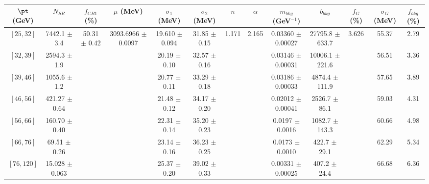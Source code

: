 \begin{tabular}{c||c|c|c|c|c|c|c|c|c|c|c||c}
$\pt$ (GeV) & $N_{SR}$ & $f_{CB1}$ (\%) & $\mu$ (MeV) & $\sigma_1$ (MeV) & $\sigma_2$ (MeV) & $n$ & $\alpha$ & $m_{bkg}$ (GeV$^{-1}$) & $b_{bkg}$ & $f_G$ (\%) & $\sigma_G$ (MeV) & $f_{bkg}$ (\%) \\
\hline
$[25, 32]$ & 7442.1 $\pm$ 3.4 & \multirow{7}{*}{50.31 $\pm$ 0.42} & \multirow{7}{*}{3093.6966 $\pm$ 0.0097} & 19.610 $\pm$ 0.094 & 31.85 $\pm$ 0.15 & \multirow{7}{*}{1.171} & \multirow{7}{*}{2.165} & 0.03360 $\pm$ 0.00027 & 27795.8 $\pm$ 633.7 & \multirow{7}{*}{3.626} & 55.37 & 2.79\\
$[32, 39]$ & 2594.3 $\pm$ 1.9 &  &  & 20.19 $\pm$ 0.10 & 32.57 $\pm$ 0.16 &  &  & 0.03146 $\pm$ 0.00031 & 10006.1 $\pm$ 221.6 &  & 56.51 & 3.36\\
$[39, 46]$ & 1055.6 $\pm$ 1.2 &  &  & 20.77 $\pm$ 0.11 & 33.29 $\pm$ 0.18 &  &  & 0.03186 $\pm$ 0.00033 & 4874.4 $\pm$ 111.9 &  & 57.65 & 3.89\\
$[46, 56]$ & 421.27 $\pm$ 0.64 &  &  & 21.48 $\pm$ 0.12 & 34.17 $\pm$ 0.20 &  &  & 0.02012 $\pm$ 0.00041 & 2526.7 $\pm$ 86.1 &  & 59.03 & 4.31\\
$[56, 66]$ & 160.70 $\pm$ 0.40 &  &  & 22.31 $\pm$ 0.14 & 35.20 $\pm$ 0.23 &  &  & 0.0197 $\pm$ 0.0016 & 1082.7 $\pm$ 143.3 &  & 60.66 & 4.98\\
$[66, 76]$ & 69.51 $\pm$ 0.26 &  &  & 23.14 $\pm$ 0.16 & 36.23 $\pm$ 0.25 &  &  & 0.0173 $\pm$ 0.0010 & 422.7 $\pm$ 29.1 &  & 62.29 & 5.34\\
$[76, 120]$ & 15.028 $\pm$ 0.063 &  &  & 25.37 $\pm$ 0.20 & 39.02 $\pm$ 0.33 &  &  & 0.00331 $\pm$ 0.00025 & 407.2 $\pm$ 24.4 &  & 66.68 & 6.36\\
\end{tabular}
